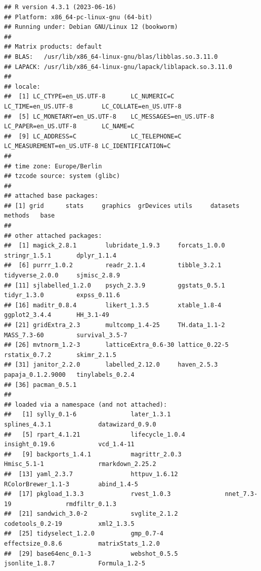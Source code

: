 \documentclass[
  doc]{apa6}
\begin{document}
\begin{verbatim}
## R version 4.3.1 (2023-06-16)
## Platform: x86_64-pc-linux-gnu (64-bit)
## Running under: Debian GNU/Linux 12 (bookworm)
## 
## Matrix products: default
## BLAS:   /usr/lib/x86_64-linux-gnu/blas/libblas.so.3.11.0 
## LAPACK: /usr/lib/x86_64-linux-gnu/lapack/liblapack.so.3.11.0
## 
## locale:
##  [1] LC_CTYPE=en_US.UTF-8       LC_NUMERIC=C               LC_TIME=en_US.UTF-8        LC_COLLATE=en_US.UTF-8    
##  [5] LC_MONETARY=en_US.UTF-8    LC_MESSAGES=en_US.UTF-8    LC_PAPER=en_US.UTF-8       LC_NAME=C                 
##  [9] LC_ADDRESS=C               LC_TELEPHONE=C             LC_MEASUREMENT=en_US.UTF-8 LC_IDENTIFICATION=C       
## 
## time zone: Europe/Berlin
## tzcode source: system (glibc)
## 
## attached base packages:
## [1] grid      stats     graphics  grDevices utils     datasets  methods   base     
## 
## other attached packages:
##  [1] magick_2.8.1        lubridate_1.9.3     forcats_1.0.0       stringr_1.5.1       dplyr_1.1.4        
##  [6] purrr_1.0.2         readr_2.1.4         tibble_3.2.1        tidyverse_2.0.0     sjmisc_2.8.9       
## [11] sjlabelled_1.2.0    psych_2.3.9         ggstats_0.5.1       tidyr_1.3.0         expss_0.11.6       
## [16] maditr_0.8.4        likert_1.3.5        xtable_1.8-4        ggplot2_3.4.4       HH_3.1-49          
## [21] gridExtra_2.3       multcomp_1.4-25     TH.data_1.1-2       MASS_7.3-60         survival_3.5-7     
## [26] mvtnorm_1.2-3       latticeExtra_0.6-30 lattice_0.22-5      rstatix_0.7.2       skimr_2.1.5        
## [31] janitor_2.2.0       labelled_2.12.0     haven_2.5.3         papaja_0.1.2.9000   tinylabels_0.2.4   
## [36] pacman_0.5.1       
## 
## loaded via a namespace (and not attached):
##   [1] sylly_0.1-6               later_1.3.1               splines_4.3.1             datawizard_0.9.0         
##   [5] rpart_4.1.21              lifecycle_1.0.4           insight_0.19.6            vcd_1.4-11               
##   [9] backports_1.4.1           magrittr_2.0.3            Hmisc_5.1-1               rmarkdown_2.25.2         
##  [13] yaml_2.3.7                httpuv_1.6.12             RColorBrewer_1.1-3        abind_1.4-5              
##  [17] pkgload_1.3.3             rvest_1.0.3               nnet_7.3-19               rmdfiltr_0.1.3           
##  [21] sandwich_3.0-2            svglite_2.1.2             codetools_0.2-19          xml2_1.3.5               
##  [25] tidyselect_1.2.0          gmp_0.7-4                 effectsize_0.8.6          matrixStats_1.2.0        
##  [29] base64enc_0.1-3           webshot_0.5.5             jsonlite_1.8.7            Formula_1.2-5            

\end{verbatim}
\end{document}

